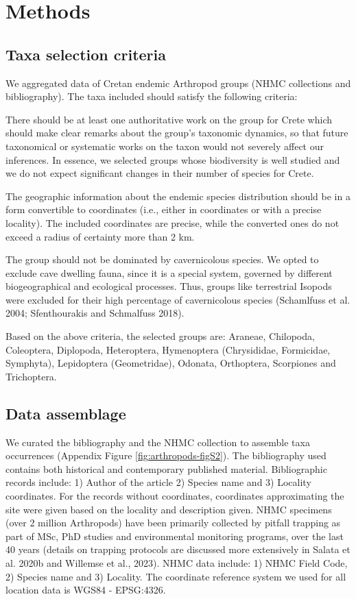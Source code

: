 \section{Methods}
\label{sec:arthropods-method}
   
    \subsection{Taxa selection criteria}
    \label{subsec:arthropods-taxa-selection}

We aggregated data of Cretan endemic Arthropod groups (NHMC collections and bibliography). The taxa included should satisfy the following criteria:

There should be at least one authoritative work on the group for Crete which
should make clear remarks about the group’s taxonomic dynamics, so that future
taxonomical or systematic works on the taxon would not severely affect our inferences.
In essence, we selected groups whose biodiversity is well studied and we do not
expect significant changes in their number of species for Crete. 

The geographic information about the endemic species distribution should be in
a form convertible to coordinates (i.e., either in coordinates or with a
precise locality). The included coordinates are precise, while the converted
ones do not exceed a radius of certainty more than 2 km.

The group should not be dominated by cavernicolous species. We opted to exclude
cave dwelling fauna, since it is a special system, governed by different
biogeographical and ecological processes. Thus, groups like terrestrial Isopods
were excluded for their high percentage of cavernicolous species (Schamlfuss et al. 2004; Sfenthourakis and Schmalfuss 2018).

Based on the above criteria, the selected groups are:
Araneae, Chilopoda, Coleoptera, Diplopoda, Heteroptera, Hymenoptera (Chrysididae, Formicidae, Symphyta), Lepidoptera (Geometridae), Odonata, Orthoptera, Scorpiones and Trichoptera.

    \subsection{Data assemblage}
    \label{subsec:arthropods-data-assemblage}

We curated the bibliography and the NHMC collection to assemble taxa
occurrences (Appendix Figure \ref{fig:arthropods-figS2}). The bibliography used
contains both historical and contemporary published material. Bibliographic
records include: 1) Author of the article 2) Species name and 3) Locality coordinates.
For the records without coordinates, coordinates approximating the site were
given based on the locality and description given. NHMC specimens (over 2
million Arthropods) have been primarily collected by pitfall trapping as part
of MSc, PhD studies and environmental monitoring programs, over the last 40
years (details on trapping protocols are discussed more extensively in Salata et al. 2020b and Willemse et al., 2023).
NHMC data include: 1) NHMC Field Code, 2) Species name and 3) Locality.
The coordinate reference system we used for all location data is WGS84 - EPSG:4326.

